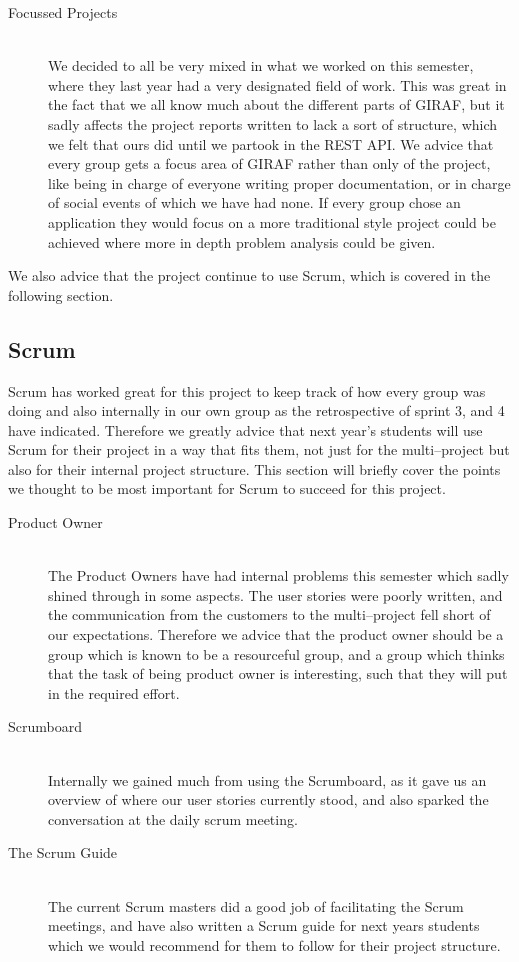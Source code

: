 \begin{description}
	\item[Focussed Projects] \hfill \\
	We decided to all be very mixed in what we worked on this semester, where they last year had a very designated field of work.
	This was great in the fact that we all know much about the different parts of GIRAF, but it sadly affects the project reports written to lack a sort of structure, which we felt that ours did until we partook in the REST API.
	We advice that every group gets a focus area of GIRAF rather than only of the project, like being in charge of everyone writing proper documentation, or in charge of social events of which we have had none.
	If every group chose an application they would focus on a more traditional style project could be achieved where more in depth problem analysis could be given.
\end{description}

We also advice that the project continue to use Scrum, which is covered in the following section.

\subsection{Scrum}
Scrum has worked great for this project to keep track of how every group was doing and also internally in our own group as the retrospective of sprint 3, and 4 have indicated.
Therefore we greatly advice that next year's students will use Scrum for their project in a way that fits them, not just for the multi--project but also for their internal project structure.
This section will briefly cover the points we thought to be most important for Scrum to succeed for this project.

\begin{description}
	\item[Product Owner] \hfill \\
	The Product Owners have had internal problems this semester which sadly shined through in some aspects.
	The user stories were poorly written, and the communication from the customers to the multi--project fell short of our expectations.
	Therefore we advice that the product owner should be a group which is known to be a resourceful group, and a group which thinks that the task of being product owner is interesting, such that they will put in the required effort.

	\item[Scrumboard] \hfill \\
	Internally we gained much from using the Scrumboard, as it gave us an overview of where our user stories currently stood, and also sparked the conversation at the daily scrum meeting.

	\item[The Scrum Guide] \hfill \\
	The current Scrum masters did a good job of facilitating the Scrum meetings, and have also written a Scrum guide for next years students which we would recommend for them to follow for their project structure.
\end{description}
